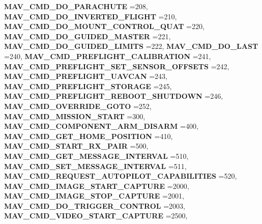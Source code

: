 \begin{DoxyCompactItemize}
\newline
\textbf{ M\+A\+V\+\_\+\+C\+M\+D\+\_\+\+D\+O\+\_\+\+P\+A\+R\+A\+C\+H\+U\+TE} =208, 
\textbf{ M\+A\+V\+\_\+\+C\+M\+D\+\_\+\+D\+O\+\_\+\+I\+N\+V\+E\+R\+T\+E\+D\+\_\+\+F\+L\+I\+G\+HT} =210, 
\textbf{ M\+A\+V\+\_\+\+C\+M\+D\+\_\+\+D\+O\+\_\+\+M\+O\+U\+N\+T\+\_\+\+C\+O\+N\+T\+R\+O\+L\+\_\+\+Q\+U\+AT} =220, 
\textbf{ M\+A\+V\+\_\+\+C\+M\+D\+\_\+\+D\+O\+\_\+\+G\+U\+I\+D\+E\+D\+\_\+\+M\+A\+S\+T\+ER} =221, 
\newline
\textbf{ M\+A\+V\+\_\+\+C\+M\+D\+\_\+\+D\+O\+\_\+\+G\+U\+I\+D\+E\+D\+\_\+\+L\+I\+M\+I\+TS} =222, 
\textbf{ M\+A\+V\+\_\+\+C\+M\+D\+\_\+\+D\+O\+\_\+\+L\+A\+ST} =240, 
\textbf{ M\+A\+V\+\_\+\+C\+M\+D\+\_\+\+P\+R\+E\+F\+L\+I\+G\+H\+T\+\_\+\+C\+A\+L\+I\+B\+R\+A\+T\+I\+ON} =241, 
\textbf{ M\+A\+V\+\_\+\+C\+M\+D\+\_\+\+P\+R\+E\+F\+L\+I\+G\+H\+T\+\_\+\+S\+E\+T\+\_\+\+S\+E\+N\+S\+O\+R\+\_\+\+O\+F\+F\+S\+E\+TS} =242, 
\newline
\textbf{ M\+A\+V\+\_\+\+C\+M\+D\+\_\+\+P\+R\+E\+F\+L\+I\+G\+H\+T\+\_\+\+U\+A\+V\+C\+AN} =243, 
\textbf{ M\+A\+V\+\_\+\+C\+M\+D\+\_\+\+P\+R\+E\+F\+L\+I\+G\+H\+T\+\_\+\+S\+T\+O\+R\+A\+GE} =245, 
\textbf{ M\+A\+V\+\_\+\+C\+M\+D\+\_\+\+P\+R\+E\+F\+L\+I\+G\+H\+T\+\_\+\+R\+E\+B\+O\+O\+T\+\_\+\+S\+H\+U\+T\+D\+O\+WN} =246, 
\textbf{ M\+A\+V\+\_\+\+C\+M\+D\+\_\+\+O\+V\+E\+R\+R\+I\+D\+E\+\_\+\+G\+O\+TO} =252, 
\newline
\textbf{ M\+A\+V\+\_\+\+C\+M\+D\+\_\+\+M\+I\+S\+S\+I\+O\+N\+\_\+\+S\+T\+A\+RT} =300, 
\textbf{ M\+A\+V\+\_\+\+C\+M\+D\+\_\+\+C\+O\+M\+P\+O\+N\+E\+N\+T\+\_\+\+A\+R\+M\+\_\+\+D\+I\+S\+A\+RM} =400, 
\textbf{ M\+A\+V\+\_\+\+C\+M\+D\+\_\+\+G\+E\+T\+\_\+\+H\+O\+M\+E\+\_\+\+P\+O\+S\+I\+T\+I\+ON} =410, 
\textbf{ M\+A\+V\+\_\+\+C\+M\+D\+\_\+\+S\+T\+A\+R\+T\+\_\+\+R\+X\+\_\+\+P\+A\+IR} =500, 
\newline
\textbf{ M\+A\+V\+\_\+\+C\+M\+D\+\_\+\+G\+E\+T\+\_\+\+M\+E\+S\+S\+A\+G\+E\+\_\+\+I\+N\+T\+E\+R\+V\+AL} =510, 
\textbf{ M\+A\+V\+\_\+\+C\+M\+D\+\_\+\+S\+E\+T\+\_\+\+M\+E\+S\+S\+A\+G\+E\+\_\+\+I\+N\+T\+E\+R\+V\+AL} =511, 
\textbf{ M\+A\+V\+\_\+\+C\+M\+D\+\_\+\+R\+E\+Q\+U\+E\+S\+T\+\_\+\+A\+U\+T\+O\+P\+I\+L\+O\+T\+\_\+\+C\+A\+P\+A\+B\+I\+L\+I\+T\+I\+ES} =520, 
\textbf{ M\+A\+V\+\_\+\+C\+M\+D\+\_\+\+I\+M\+A\+G\+E\+\_\+\+S\+T\+A\+R\+T\+\_\+\+C\+A\+P\+T\+U\+RE} =2000, 
\newline
\textbf{ M\+A\+V\+\_\+\+C\+M\+D\+\_\+\+I\+M\+A\+G\+E\+\_\+\+S\+T\+O\+P\+\_\+\+C\+A\+P\+T\+U\+RE} =2001, 
\textbf{ M\+A\+V\+\_\+\+C\+M\+D\+\_\+\+D\+O\+\_\+\+T\+R\+I\+G\+G\+E\+R\+\_\+\+C\+O\+N\+T\+R\+OL} =2003, 
\textbf{ M\+A\+V\+\_\+\+C\+M\+D\+\_\+\+V\+I\+D\+E\+O\+\_\+\+S\+T\+A\+R\+T\+\_\+\+C\+A\+P\+T\+U\+RE} =2500, 

\end{DoxyCompactItemize}
